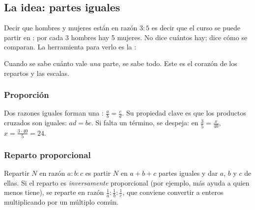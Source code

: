 

\subsection{La idea: partes iguales}
Decir que hombres y mujeres están en razón $3 : 5$ es decir que el curso se puede partir en : por
cada 3 hombres hay 5 mujeres. No dice cuántos hay; dice cómo se comparan. La herramienta para verlo es la
:


Cuando se sabe cuánto vale \emph{una} parte, se sabe todo. Este es el corazón de los repartos y las escalas.

\subsubsection{Proporción}
Dos razones iguales forman una : $\tfrac ab = \tfrac cd$. Su propiedad clave es que los productos
cruzados son iguales: $ad = bc$. Si falta un término, se despeja: en $\tfrac{3}{5} = \tfrac{x}{40}$, $x = \tfrac{3 \cdot
40}{5} = 24$.

\subsubsection{Reparto proporcional}
Repartir $N$ en razón $a : b : c$ es partir $N$ en $a + b + c$ partes iguales y dar $a$, $b$ y $c$ de ellas. Si el
reparto es \emph{inversamente} proporcional (por ejemplo, más ayuda a quien menos tiene), se reparte en razón
$\tfrac1a : \tfrac1b : \tfrac1c$, que conviene convertir a enteros multiplicando por un múltiplo común.

